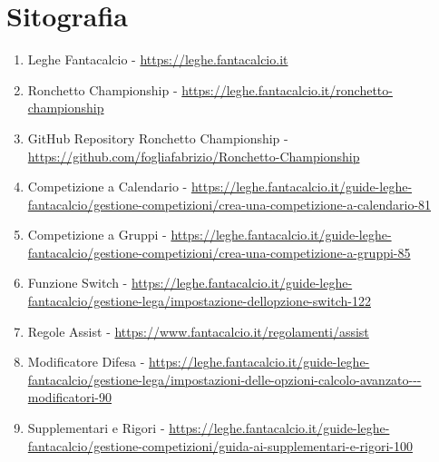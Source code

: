 \documentclass[12pt]{article}
\begin{document}
\section*{Sitografia}
\begin{enumerate}
    \item\label{leghe-fantacalcio} Leghe Fantacalcio - \url{https://leghe.fantacalcio.it}
    \item\label{ronchetto-championship} Ronchetto Championship - \url{https://leghe.fantacalcio.it/ronchetto-championship}
    \item\label{repository-ronchetto-championship} GitHub Repository Ronchetto Championship - \url{https://github.com/fogliafabrizio/Ronchetto-Championship}
    \item\label{competizione-a-calendario} Competizione a Calendario - \url{https://leghe.fantacalcio.it/guide-leghe-fantacalcio/gestione-competizioni/crea-una-competizione-a-calendario-81}
    \item\label{competizione-a-gruppi} Competizione a Gruppi - \url{https://leghe.fantacalcio.it/guide-leghe-fantacalcio/gestione-competizioni/crea-una-competizione-a-gruppi-85}
    \item\label{funzione-switch} Funzione Switch - \url{https://leghe.fantacalcio.it/guide-leghe-fantacalcio/gestione-lega/impostazione-dellopzione-switch-122}
    \item\label{assist} Regole Assist - \url{https://www.fantacalcio.it/regolamenti/assist}
    \item\label{modificatore-difesa} Modificatore Difesa - \url{https://leghe.fantacalcio.it/guide-leghe-fantacalcio/gestione-lega/impostazioni-delle-opzioni-calcolo-avanzato---modificatori-90}
    \item\label{supplementari-rigori} Supplementari e Rigori - \url{https://leghe.fantacalcio.it/guide-leghe-fantacalcio/gestione-competizioni/guida-ai-supplementari-e-rigori-100}
\end{enumerate}

\newpage
\end{document}
